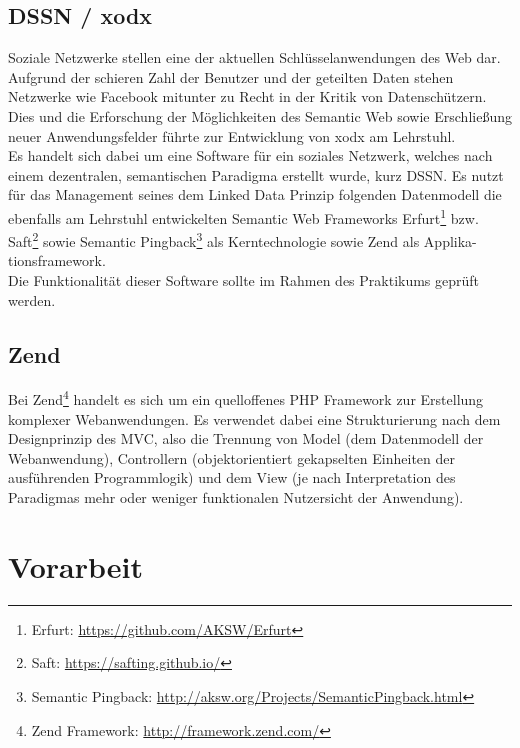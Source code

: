 \documentclass{article}
\begin{document}
\subsection{DSSN / xodx}

Soziale Netzwerke stellen eine der aktuellen Schlüsselanwendungen des Web dar. Aufgrund der schieren Zahl der Benutzer und der geteilten Daten stehen Netzwerke wie Facebook mitunter zu Recht in der Kritik von Datenschützern. Dies und die Erforschung der Möglichkeiten des Semantic Web sowie Erschließung neuer Anwendungsfelder führte zur Entwicklung von xodx\cite{xodx_paper} am Lehrstuhl.\\
Es handelt sich dabei um eine Software für ein soziales Netzwerk, welches nach einem dezentralen, semantischen Paradigma erstellt wurde, kurz DSSN. Es nutzt für das Management seines dem Linked Data Prinzip folgenden Datenmodell die ebenfalls am Lehrstuhl entwickelten Semantic Web Frameworks Erfurt\footnote{Erfurt: \url{https://github.com/AKSW/Erfurt}} bzw. Saft\footnote{Saft: \url{https://safting.github.io/}} sowie Semantic Pingback\footnote{Semantic Pingback: \url{http://aksw.org/Projects/SemanticPingback.html}} als Kerntechnologie sowie Zend als Applika-tionsframework.\\
Die Funktionalität dieser Software sollte im Rahmen des Praktikums geprüft werden.

\subsection{Zend}

Bei Zend\footnote{Zend Framework: \url{http://framework.zend.com/}} handelt es sich um ein quelloffenes PHP Framework zur Erstellung komplexer Webanwendungen. Es verwendet dabei eine Strukturierung nach dem Designprinzip des MVC, also die Trennung von Model (dem Datenmodell der Webanwendung), Controllern (objektorientiert gekapselten Einheiten der ausführenden Programmlogik) und dem View (je nach Interpretation des Paradigmas mehr oder weniger funktionalen Nutzersicht der Anwendung).

\section{Vorarbeit}
\end{document}
